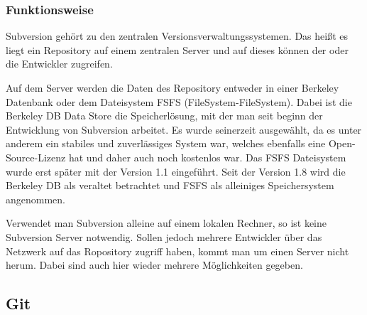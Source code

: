 \subsubsection{Funktionsweise}
Subversion gehört zu den zentralen Versionsverwaltungssystemen. Das heißt es liegt ein Repository auf einem zentralen Server und auf dieses können der oder die Entwickler zugreifen.

Auf dem Server werden die Daten des Repository entweder in einer Berkeley Datenbank oder dem Dateisystem FSFS (FileSystem-FileSystem). Dabei ist die Berkeley DB Data Store die Speicherlösung, mit der man seit beginn der Entwicklung von Subversion arbeitet. Es wurde seinerzeit ausgewählt, da es unter anderem ein stabiles und zuverlässiges System war, welches ebenfalls eine Open-Source-Lizenz hat und daher auch noch kostenlos war. Das FSFS Dateisystem wurde erst später mit der Version 1.1 eingeführt. Seit der Version 1.8 wird die Berkeley DB als veraltet betrachtet und FSFS als alleiniges Speichersystem angenommen. 

Verwendet man Subversion alleine auf einem lokalen Rechner, so ist keine Subversion Server notwendig. Sollen jedoch mehrere Entwickler über das Netzwerk auf das Ropository zugriff haben, kommt man um einen Server nicht herum. Dabei sind auch hier wieder mehrere Möglichkeiten gegeben. 

\subsection{Git}

